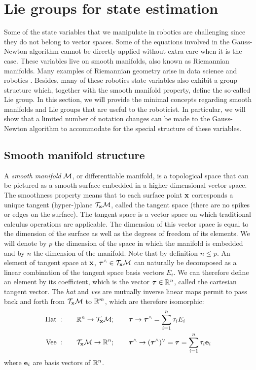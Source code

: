 \section{Lie groups for state estimation}
Some of the state variables that we manipulate in robotics are challenging since they do not belong to vector spaces. Some of the equations
involved in the Gauss-Newton algorithm cannot be directly applied without extra care when it is the case.
These variables live on smooth manifolds, also known as Riemannian manifolds. 
Many examples of Riemannian geometry arise in data science and robotics \cite{miolane2020geomstats}. 
Besides, many of these robotics state variables also exhibit a group structure which, together with the smooth manifold
property, define the so-called Lie group.
In this section, we will provide the minimal concepts regarding smooth manifolds and Lie groups that are useful to the roboticist. In particular, we will show 
that a limited number of notation changes can be made to the Gauss-Newton algorithm to accommodate for the special structure of these variables.



\subsection{Smooth manifold structure}
A \textit{smooth manifold} $\mathcal{M}$, or differentiable manifold, is a topological space that can be pictured as a smooth surface embedded in a higher dimensional vector space.
The smoothness property means that to each surface point ${\bf x}$ corresponds a unique tangent \mbox{(hyper-)plane} $\mathcal{T}_{{\bf x}}\mathcal{M}$, called the tangent space 
(there are no spikes or edges on the surface). The tangent space is a vector space on which traditional calculus operations are applicable. The dimension of this 
vector space is equal to the dimension of the surface as well as the degrees of freedom of its elements.
We will denote by $p$ the dimension of the space in which the manifold is embedded and by $n$ the dimension of the manifold.
Note that by definition $n \leq p$.  
An element of tangent space at ${\bf x}$, ${\bm \tau}^\wedge \in \mathcal{T}_{{\bf x}}\mathcal{M}$ can naturally be decomposed as a linear combination 
of the tangent space basis vectors $E_i$. We can therefore define an element by its coefficient, which is the vector ${\bm \tau} \in \mathbb{R}^n$, called the cartesian tangent vector.
The \textit{hat} and \textit{vee} are mutually inverse linear maps permit to pass back and forth from $\mathcal{T}_{{\bf x}}\mathcal{M}$ to $\mathbb{R}^m$, which are therefore isomorphic:
%
\begin{align}
    \text{Hat} ~ :& \quad\quad \mathbb{R}^n \rightarrow \mathcal{T}_{{\bf x}}\mathcal{M}; \quad\quad {\bm \tau} \rightarrow {\bm \tau}^\wedge = \sum_{i=1}^n\tau_i E_i  \\
    \text{Vee} ~ :& \quad\quad \mathcal{T}_{{\bf x}}\mathcal{M} \rightarrow \mathbb{R}^n; \quad\quad {\bm \tau}^\wedge \rightarrow ({\bm \tau}^\wedge)^\vee = {\bm \tau} = \sum_{i=1}^n\tau_i {\bf e}_i
\end{align}
%
where ${\bf e}_i$ are basis vectors of $\mathbb{R}^n$.


